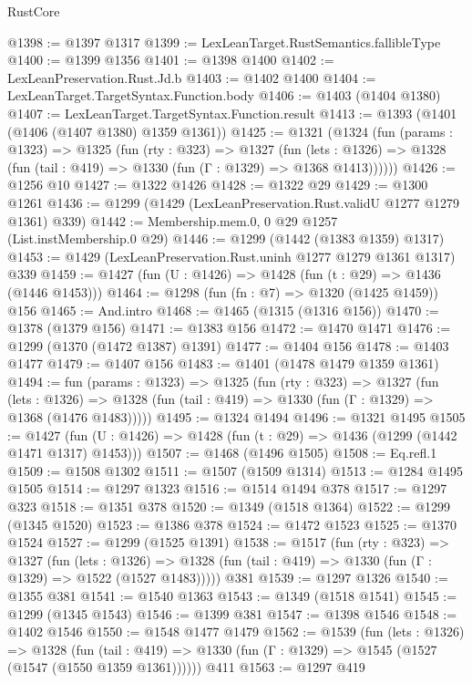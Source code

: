 \begin{lexlean}{RustCore}
\begin{coremodule}
@1398 := @1397 @1317
@1399 := LexLeanTarget.RustSemantics.fallibleType
@1400 := @1399 @1356
@1401 := @1398 @1400
@1402 := LexLeanPreservation.Rust.Jd.b
@1403 := @1402 @1400
@1404 := LexLeanTarget.TargetSyntax.Function.body
@1406 := @1403 (@1404 @1380)
@1407 := LexLeanTarget.TargetSyntax.Function.result
@1413 := @1393 (@1401 (@1406 (@1407 @1380) @1359 @1361))
@1425 := @1321
    (@1324
      (fun (params : @1323) =>
      @1325
        (fun (rty : @323) =>
        @1327
          (fun (lets : @1326) =>
          @1328 (fun (tail : @419) => @1330 (fun (Γ : @1329) => @1368 @1413))))))
@1426 := @1256 @10
@1427 := @1322 @1426
@1428 := @1322 @29
@1429 := @1300 @1261
@1436 := @1299 (@1429 (LexLeanPreservation.Rust.validU @1277 @1279 @1361) @339)
@1442 := Membership.mem.{0, 0} @29 @1257 (List.instMembership.{0} @29)
@1446 := @1299 (@1442 (@1383 @1359) @1317)
@1453 := @1429 (LexLeanPreservation.Rust.uninh @1277 @1279 @1361 @1317) @339
@1459 := @1427 (fun (U : @1426) => @1428 (fun (t : @29) => @1436 (@1446 @1453)))
@1464 := @1298 (fun (fn : @7) => @1320 (@1425 @1459)) @156
@1465 := And.intro
@1468 := @1465 (@1315 (@1316 @156))
@1470 := @1378 (@1379 @156)
@1471 := @1383 @156
@1472 := @1470 @1471
@1476 := @1299 (@1370 (@1472 @1387) @1391)
@1477 := @1404 @156
@1478 := @1403 @1477
@1479 := @1407 @156
@1483 := @1401 (@1478 @1479 @1359 @1361)
@1494 := fun (params : @1323) =>
  @1325
    (fun (rty : @323) =>
    @1327
      (fun (lets : @1326) =>
      @1328 (fun (tail : @419) => @1330 (fun (Γ : @1329) => @1368 (@1476 @1483)))))
@1495 := @1324 @1494
@1496 := @1321 @1495
@1505 := @1427 (fun (U : @1426) => @1428 (fun (t : @29) => @1436 (@1299 (@1442 @1471 @1317) @1453)))
@1507 := @1468 (@1496 @1505)
@1508 := Eq.refl.{1}
@1509 := @1508 @1302
@1511 := @1507 (@1509 @1314)
@1513 := @1284 @1495 @1505
@1514 := @1297 @1323
@1516 := @1514 @1494 @378
@1517 := @1297 @323
@1518 := @1351 @378
@1520 := @1349 (@1518 @1364)
@1522 := @1299 (@1345 @1520)
@1523 := @1386 @378
@1524 := @1472 @1523
@1525 := @1370 @1524
@1527 := @1299 (@1525 @1391)
@1538 := @1517
    (fun (rty : @323) =>
    @1327
      (fun (lets : @1326) =>
      @1328 (fun (tail : @419) => @1330 (fun (Γ : @1329) => @1522 (@1527 @1483)))))
    @381
@1539 := @1297 @1326
@1540 := @1355 @381
@1541 := @1540 @1363
@1543 := @1349 (@1518 @1541)
@1545 := @1299 (@1345 @1543)
@1546 := @1399 @381
@1547 := @1398 @1546
@1548 := @1402 @1546
@1550 := @1548 @1477 @1479
@1562 := @1539
    (fun (lets : @1326) =>
    @1328
      (fun (tail : @419) => @1330 (fun (Γ : @1329) => @1545 (@1527 (@1547 (@1550 @1359 @1361))))))
    @411
@1563 := @1297 @419

\end{coremodule}
\end{lexlean}
